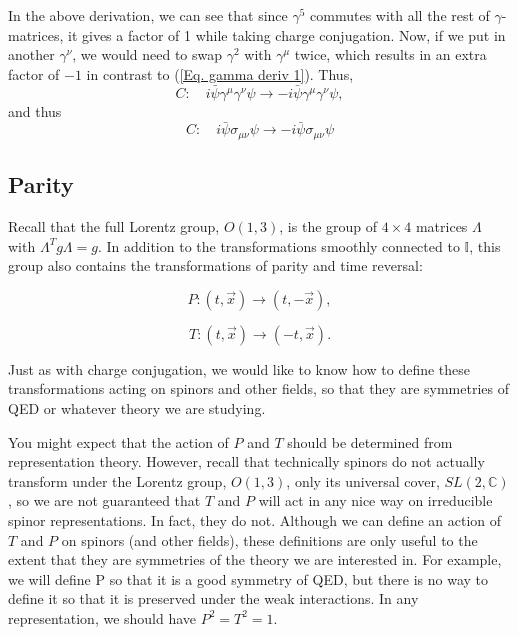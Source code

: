 \documentclass[11pt]{article}
\theoremstyle{definition}
\begin{document}
\begin{tcolorbox}[breakable, colback=yellow!20!white, colframe=black, boxrule=1pt]
In the above derivation, we can see that since $\gamma^5$ commutes with all the rest of $\gamma$-matrices, it gives a factor of 1 while taking charge conjugation. Now, if we put in another $\gamma^\nu$, we would need to swap $\gamma^2$ with $\gamma^\mu$ twice, which results in an extra factor of $-1$ in contrast to (\ref{Eq. gamma deriv 1}). Thus, 
\begin{equation}
    C: \quad i\bar{\psi}\gamma^\mu\gamma^\nu\psi \rightarrow -i\bar{\psi}\gamma^\mu\gamma^\nu\psi,
\end{equation}
and thus
\begin{equation}
    C: \quad i\bar{\psi}\sigma_{\mu\nu}\psi \rightarrow -i\bar{\psi}\sigma_{\mu\nu}\psi
\end{equation}
\end{tcolorbox}

\subsection{Parity}
Recall that the full Lorentz group, \( O(1, 3) \), is the group of \( 4 \times 4 \) matrices \( \Lambda \) with \( \Lambda^T g \Lambda = g \).  
In addition to the transformations smoothly connected to \( \mathbb{I} \), this group also contains the transformations of parity and time reversal:  

\begin{equation}
P : (t, \vec{x}) \rightarrow (t, -\vec{x}),
\end{equation}

\begin{equation}
T : (t, \vec{x}) \rightarrow (-t, \vec{x}).
\end{equation}

Just as with charge conjugation, we would like to know how to define these transformations acting on spinors and other fields, so that they are symmetries of QED or whatever theory we are studying.  

You might expect that the action of \( P \) and \( T \) should be determined from representation theory. However, recall that technically spinors do not actually transform under the Lorentz group, \( O(1, 3) \), only its universal cover, \( SL(2, \mathbb{C}) \), so we are not guaranteed that \( T \) and \( P \) will act in any nice way on irreducible spinor representations. In fact, they do not. Although we can define an action of \( T \) and \( P \) on spinors (and other fields), these definitions are only useful to the extent that they are symmetries of the theory we are interested in. For example, we will define P so that it is a good symmetry of QED, but there is no way to define it so that it is preserved under the weak interactions. In any representation, we should have \( P^2 = T^2 = 1 \).
\end{document}
